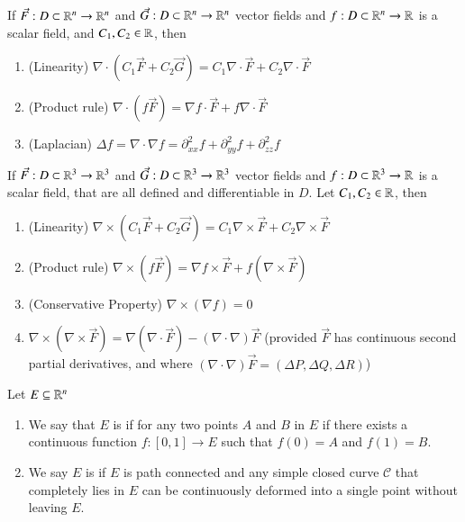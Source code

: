 \documentclass[12pt, a4paper, oneside, openright, titlepage]{book}
\begin{document}
\begin{appendices}
    \begin{prop}
        If $\vec{F}:D\subset \mathbb R^n \rightarrow \mathbb R^n$ and $\vec{G}:D\subset \mathbb R^n \rightarrow \mathbb R^n$ vector fields and $f:D\subset \mathbb R^n \rightarrow \mathbb R$ is a scalar field, and $C_1,C_2 \in \mathbb R$, then \begin{enumerate}
            \item (Linearity) $\nabla \cdot (C_1\vec{F} + C_2\vec{G}) = C_1\nabla \cdot \vec{F} + C_2\nabla \cdot \vec{F}$
            \item (Product rule) $\nabla \cdot (f\vec{F}) = \nabla f \cdot \vec{F} + f\nabla\cdot \vec{F}$
            \item (Laplacian) $\Delta f = \nabla \cdot \nabla f = \partial_{xx}^2f + \partial_{yy}^2f + \partial_{zz}^2f$
        \end{enumerate}
    \end{prop}
    
    \begin{prop}
        If $\vec{F}:D\subset \mathbb R^3 \rightarrow \mathbb R^3$ and $\vec{G}:D\subset \mathbb R^3 \rightarrow \mathbb R^3$ vector fields and $f:D\subset \mathbb R^3 \rightarrow \mathbb R$ is a scalar field, that are all defined and differentiable in $D$. Let $C_1,C_2 \in \mathbb R$, then \begin{enumerate}
            \item (Linearity) $\nabla \times (C_1\vec{F} + C_2\vec{G}) = C_1\nabla \times \vec{F} + C_2\nabla \times \vec{F}$
            \item (Product rule) $\nabla \times (f\vec{F}) = \nabla f \times \vec{F} + f(\nabla\times \vec{F})$
            \item (Conservative Property) $\nabla \times (\nabla f) = 0$
            \item $\nabla \times(\nabla \times \vec{F}) = \nabla(\nabla\cdot \vec{F}) - (\nabla \cdot \nabla)\vec{F}$ (provided $\vec{F}$ has continuous second partial derivatives, and where $(\nabla \cdot \nabla)\vec{F} = (\Delta P, \Delta Q, \Delta R)$)
        \end{enumerate}
    \end{prop}
    
    \begin{defn}
        Let $E \subseteq \mathbb R^n$ \begin{enumerate}
            \item We say that $E$ is  if for any two points $A$ and $B$ in $E$ if there exists a continuous function $f:[0,1] \rightarrow E$ such that $f(0) = A$ and $f(1) = B$.
            \item We say $E$ is  if $E$ is path connected and any simple closed curve $\mathcal{C}$ that completely lies in $E$ can be continuously deformed into a single point without leaving $E$.
        \end{enumerate}
    \end{defn}
    

\end{appendices}
\end{document}
